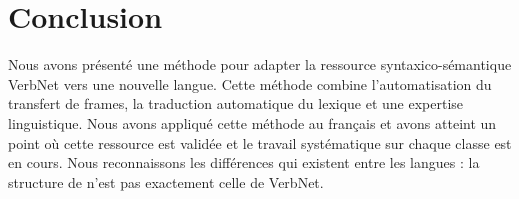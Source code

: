 \section{Conclusion}

Nous avons présenté une méthode pour adapter la ressource syntaxico-sémantique
VerbNet vers une nouvelle langue. Cette méthode combine l'automatisation du
transfert de frames, la traduction automatique du lexique et une expertise
linguistique. Nous avons appliqué cette méthode au français et avons atteint un
point où cette ressource est validée et le travail systématique sur chaque
classe est en cours. Nous reconnaissons les différences qui existent entre les
langues : la structure de \verbenet{} n'est pas exactement celle de VerbNet.

